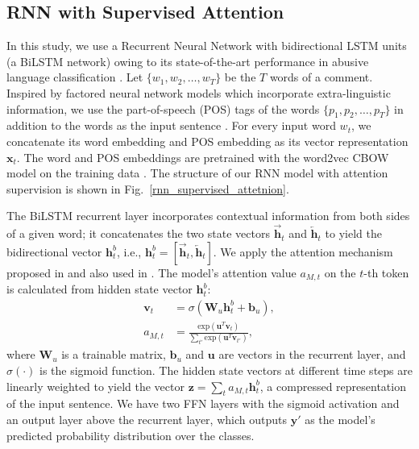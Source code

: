\documentclass[letterpaper]{article} %
\begin{document}
\subsection{RNN with Supervised Attention}
In this study, we use a Recurrent Neural Network with bidirectional LSTM units (a BiLSTM network) owing to its state-of-the-art performance in abusive language classification \cite{chakrabarty2019pay}.
Let  $\{w_{1}, w_{2}, \ldots, w_{T}\}$ be the  $T$ words of a comment.
Inspired by factored neural network models which incorporate extra-linguistic information, we use the part-of-speech (POS) tags of the words  $\{p_{1}, p_{2}, \ldots, p_{T}\}$ in addition to the words as the input sentence \cite{sennrich2016linguistic}.
For every input word $w_{t}$, we concatenate its word embedding and POS embedding as its vector representation $\mathbf{x}_{t}$. The word and POS embeddings are pretrained with the word2vec CBOW model on the training data \cite{mikolov2013distributed}.
The structure of our RNN model with attention supervision is shown in Fig.~\ref{rnn_supervised_attetnion}.


The BiLSTM recurrent layer incorporates contextual information from both sides of a given word; it concatenates the two state vectors $\overrightarrow{\mathbf{h}}_{t}$ and $\overleftarrow{\mathbf{h}}_{t}$ to yield the bidirectional vector $\mathbf{h}^{b}_{t}$, i.e., $\mathbf{h}^{b}_{t}=[\overrightarrow{\mathbf{h}}_{t},\overleftarrow{\mathbf{h}}_{t}]$.
We apply the attention mechanism proposed in \cite{yang2016hierarchical} and also used in \cite{chakrabarty2019pay}. The model's attention value $a_{M,t}$ on the $t$-th token is calculated from hidden state vector $\mathbf{h}^{b}_{t}$:
\begin{align}
\mathbf{v}_{t} &= \sigma(\mathbf{W}_{u}\mathbf{h}^{b}_{t} + \mathbf{b}_{u}), \\
a_{M,t} &= \frac{\text{exp}(\mathbf{u}^{T}\mathbf{v}_{t})}{\sum\limits_{t'}\text{exp}(\mathbf{u}^{T}\mathbf{v}_{t'})},
\end{align}
where $\mathbf{W}_{u}$ is a trainable matrix, $\mathbf{b}_{u}$ and $\mathbf{u}$ are vectors in the recurrent layer, and $\sigma(\cdot)$ is the sigmoid function.
The hidden state vectors at different time steps are linearly weighted to yield the vector $\mathbf{z}=\sum\limits_{t}a_{M,t}\mathbf{h}_{t}^{b}$, a compressed representation of the input sentence. We have two FFN layers with the sigmoid activation and an output layer above the recurrent layer, which  outputs  $\mathbf{y}'$ as the model's predicted probability distribution over the classes.
\end{document}
